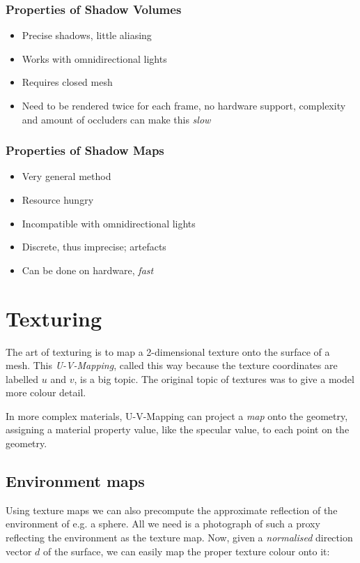 \documentclass[english]{panikzettel}
\begin{document}
\begin{halfboxl}
\subsubsection*{Properties of Shadow Volumes}
\begin{itemize}
    \item Precise shadows, little aliasing
    \item Works with omnidirectional lights
    \item Requires closed mesh
    \item Need to be rendered twice for each frame, no hardware support, complexity and amount of occluders can make this \emph{slow}
\end{itemize}
\end{halfboxl}%
\begin{halfboxr}
\subsubsection*{Properties of Shadow Maps}
\begin{itemize}
    \item Very general method
    \item Resource hungry
    \item Incompatible with omnidirectional lights
    \item Discrete, thus imprecise; artefacts
    \item Can be done on hardware, \emph{fast}
\end{itemize}
\end{halfboxr}

\section{Texturing}

The art of texturing is to map a 2-dimensional texture onto the surface of a mesh. This \emph{U-V-Mapping}, called this way because the texture coordinates are labelled $u$ and $v$, is a big topic. The original topic of textures was to give a model more colour detail.

In more complex materials, U-V-Mapping can project a \emph{map} onto the geometry, assigning a material property value, like the specular value, to each point on the geometry.

\subsection{Environment maps}
Using texture maps we can also precompute the approximate reflection of the environment of e.g. a sphere. All we need is a photograph of such a proxy reflecting the environment as the texture map. Now, given a \emph{normalised} direction vector $d$ of the surface, we can easily map the proper texture colour onto it:
\end{document}
